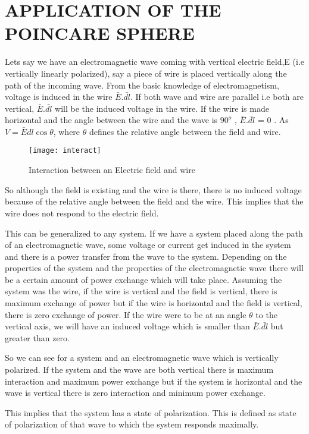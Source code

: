 	\section{APPLICATION OF THE POINCARE SPHERE}
	Lets say we have an electromagnetic wave coming with vertical electric field,E (i.e vertically linearly polarized), say a piece of wire is placed vertically along the path of the incoming wave. From the basic knowledge of electromagnetism, voltage is induced in the wire $\bar{E}$.$\bar{dl}$. If both wave and wire are parallel i.e both are vertical, $\bar{E}$.$\bar{dl}$ will be the induced voltage in the wire. If the wire is made horizontal and the angle between the wire and the wave is $90^{o}$ , $\bar{E}$.$\bar{dl}$ = 0 . As $ V = \bar{E}dl\cos\theta $, where $ \theta $ defines the relative angle between the field and wire.
	\begin{figure}
		\centering
		\texttt{[image: interact]}
		\caption{Interaction between an Electric field and wire}
		\label{fig:interact}
	\end{figure}
	
	
	
	So although the field is existing and the wire is there, there is no induced voltage because of the relative angle between the field and the wire. This implies that the wire does not respond to the electric field.
	
	This can be generalized to any system. If we have a system placed along the path of an electromagnetic wave, some voltage or current get induced in the system and there is a power transfer from the wave to the system. Depending on the properties of the system and the properties of the electromagnetic wave there will be a certain amount of power exchange which will take place. Assuming the system was the wire, if the wire is vertical and the field is vertical, there is maximum exchange of power but if the wire is horizontal and the field is vertical, there is zero exchange of power. If the wire were to be at an angle $\theta$ to the vertical axis, we will have an induced voltage which is smaller than $\bar{E}$.$\bar{dl}$ but greater than zero.
	
	So we can see for a system and an electromagnetic wave which is vertically polarized. If the system and the wave are both vertical there is maximum interaction and maximum power exchange but if the system is horizontal and the wave is vertical there is zero interaction and minimum power exchange.
	
	This implies that the system has a state of polarization. This is defined as state of polarization of that wave to which the system responds maximally.
	
